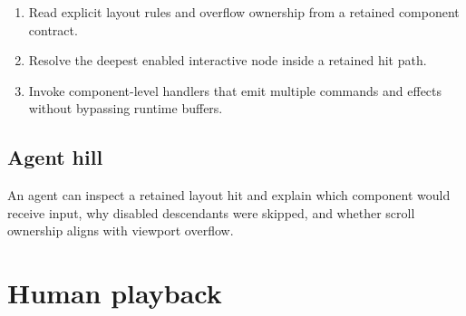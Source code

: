 \begin{enumerate}
\def\labelenumi{\arabic{enumi}.}
\tightlist
\item
  Read explicit layout rules and overflow ownership from a retained component contract.
\item
  Resolve the deepest enabled interactive node inside a retained hit path.
\item
  Invoke component-level handlers that emit multiple commands and effects without bypassing runtime buffers.
\end{enumerate}

\subsection{Agent hill}\label{record-154-agent-hill}

An agent can inspect a retained layout hit and explain which component would receive input, why disabled descendants were skipped, and whether scroll ownership aligns with viewport overflow.

\section{Human playback}\label{record-154-human-playback}

